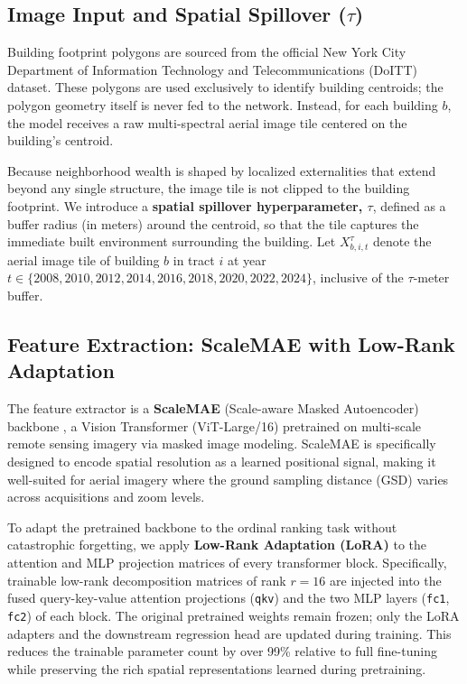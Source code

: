 \documentclass{article}
\begin{document}
\subsection{Image Input and Spatial Spillover ($\tau$)}

Building footprint polygons are sourced from the official New York City Department of Information Technology and Telecommunications (DoITT) dataset. These polygons are used exclusively to identify building centroids; the polygon geometry itself is never fed to the network. Instead, for each building $b$, the model receives a raw multi-spectral aerial image tile centered on the building's centroid.

Because neighborhood wealth is shaped by localized externalities that extend beyond any single structure, the image tile is not clipped to the building footprint. We introduce a \textbf{spatial spillover hyperparameter, $\tau$}, defined as a buffer radius (in meters) around the centroid, so that the tile captures the immediate built environment surrounding the building. Let $X_{b,i,t}^\tau$ denote the aerial image tile of building $b$ in tract $i$ at year $t \in \{2008, 2010, 2012, 2014, 2016, 2018, 2020, 2022, 2024\}$, inclusive of the $\tau$-meter buffer.



\subsection{Feature Extraction: ScaleMAE with Low-Rank Adaptation}

The feature extractor is a \textbf{ScaleMAE} (Scale-aware Masked Autoencoder) backbone \citep{reed2023scalemae}, a Vision Transformer (ViT-Large/16) pretrained on multi-scale remote sensing imagery via masked image modeling. ScaleMAE is specifically designed to encode spatial resolution as a learned positional signal, making it well-suited for aerial imagery where the ground sampling distance (GSD) varies across acquisitions and zoom levels.

To adapt the pretrained backbone to the ordinal ranking task without catastrophic forgetting, we apply \textbf{Low-Rank Adaptation (LoRA)} \citep{hu2021lora} to the attention and MLP projection matrices of every transformer block. Specifically, trainable low-rank decomposition matrices of rank $r = 16$ are injected into the fused query-key-value attention projections (\texttt{qkv}) and the two MLP layers (\texttt{fc1}, \texttt{fc2}) of each block. The original pretrained weights remain frozen; only the LoRA adapters and the downstream regression head are updated during training. This reduces the trainable parameter count by over 99\% relative to full fine-tuning while preserving the rich spatial representations learned during pretraining.
\end{document}
